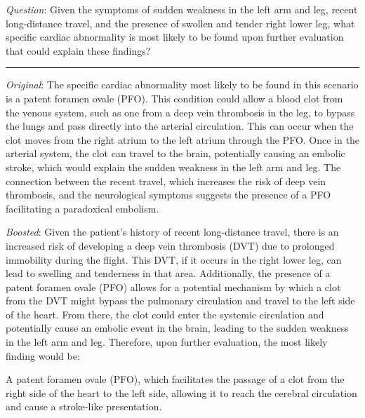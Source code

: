 \documentclass{article}
\begin{document}
\begin{center}
\begin{tcolorbox}[
    enhanced,
    width=\linewidth,
    fit to height=8.5cm,
    colback=green!4,
    colframe=green!50!black,
    boxrule=0.5pt,
    arc=2pt,
    title=\small{Medical (Qwen2.5-7B-Instruct)},
    left=2pt,
    right=2pt,
    top=1pt,
    bottom=0pt
]
{\small
\textit{Question}: Given the symptoms of sudden weakness in the left arm and leg, recent long-distance travel, and the presence of swollen and tender right lower leg, what specific cardiac abnormality is most likely to be found upon further evaluation that could explain these findings?


\noindent\rule{\linewidth}{0.4pt}
\vspace{0em}

\textit{Original}: The specific cardiac abnormality most likely to be found in this scenario is a patent foramen ovale (PFO). This condition could allow a blood clot from the venous system, such as one from a deep vein thrombosis in the leg, to bypass the lungs and pass directly into the arterial circulation. This can occur when the clot moves from the right atrium to the left atrium through the PFO. Once in the arterial system, the clot can travel to the brain, potentially causing an embolic stroke, which would explain the sudden weakness in the left arm and leg. The connection between the recent travel, which increases the risk of deep vein thrombosis, and the neurological symptoms suggests the presence of a PFO facilitating a paradoxical embolism.


\vspace{1em}

\textit{Boosted}: Given the patient's history of recent long-distance travel, there is an increased risk of developing a deep vein thrombosis (DVT) due to prolonged immobility during the flight. This DVT, if it occurs in the right lower leg, can lead to swelling and tenderness in that area. Additionally, the presence of a patent foramen ovale (PFO) allows for a potential mechanism by which a clot from the DVT might bypass the pulmonary circulation and travel to the left side of the heart. From there, the clot could enter the systemic circulation and potentially cause an embolic event in the brain, leading to the sudden weakness in the left arm and leg. Therefore, upon further evaluation, the most likely finding would be:

A patent foramen ovale (PFO), which facilitates the passage of a clot from the right side of the heart to the left side, allowing it to reach the cerebral circulation and cause a stroke-like presentation.
}
\end{tcolorbox}
\end{center}
\end{document}

